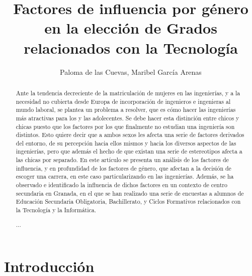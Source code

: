 \documentclass[runningheads,a4paper]{llncs}
\newcommand{\keywords}[1]{\par\addvspace\baselineskip
\noindent\keywordname\enspace\ignorespaces#1}
\begin{document}

\title{Factores de influencia por género en la elección de Grados relacionados con la Tecnología}


\author{Paloma de las Cuevas, Maribel García Arenas }


\maketitle

%
%
\begin{abstract}
Ante la tendencia decreciente de la matriculación de mujeres en las ingenierías, y a la necesidad no cubierta desde Europa de incorporación de ingenieros e ingenieras al mundo laboral, se plantea un problema a resolver, que es cómo hacer las ingenierías más atractivas para los y las adolecentes.
Se debe hacer esta distinción entre chicos y chicas puesto que los factores por los que finalmente no estudian una ingeniería son distintos. Esto quiere decir que a ambos sexos les afecta una serie de factores derivados del entorno, de su percepción hacia ellos mismos y hacia los diversos aspectos de las ingenierías, pero que además el hecho de que existan una serie de estereotipos afecta a las chicas por separado.
En este artículo se presenta un análisis de los factores de influencia, y en profundidad de los factores de género, que afectan a la decisión de escoger una carrera, en este caso particularizando en las ingenierías.
Además, se ha observado e identificado la influencia de dichos factores en un contexto de centro secundaria en Granada, en el que se han realizado una serie de encuestas a alumnos de Educación Secundaria Obligatoria, Bachillerato, y Ciclos Formativos relacionados con la Tecnología y la Informática.

\keywords{...}
\end{abstract}

%
\section{Introducción}
\label{sec:intro}
\end{document}
